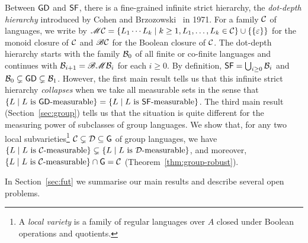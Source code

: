 Between \(\gd\) and \(\sf\), there is a fine-grained infinite strict hierarchy, the \emph{dot-depth hierarchy} introduced by Cohen and Brzozowski~\cite{dot} in 1971.
For a family \(\CC\) of languages, we write by
\(\monc \CC = \{ L_1 \cdots L_k \mid k \geq 1, L_1, \ldots, L_k \in \CC
\} \cup \{\{\varepsilon\}\}\) for the monoid closure of \(\CC\)
and \(\bool\CC\) for the Boolean closure of \(\CC\).
The dot-depth hierarchy starts with the family \(\CB_0\) of all finite
or co-finite languages and continues with \(\CB_{i+1} = \bool \monc \CB_{i}\) for each \(i \geq 0\).
By definition, \(\sf = \bigcup_{i \geq 0} \CB_i\)
and \(\CB_0 \subsetneq \gd \subsetneq \CB_1\).
However, the first main result tells us that this infinite strict hierarchy \emph{collapses} when we take all measurable sets in the sense that 
\(\{ L \mid L \text{ is } \gd\text{-measurable}\}
 = \{ L \mid L \text{ is } \sf\text{-measurable}\}\).
The third main result (Section~\ref{sec:group}) tells us that the situation is quite different for the measuring power of subclasses of group languages.
We show that, for any two local subvarieties\footnote{A \emph{local variety} is a family of regular languages over \(A\) closed under Boolean operations and quotients.} \(\CC \subsetneq \CD \subseteq \group\) of group languages, we have \(\{ L \mid L \text{ is } \CC\text{-measurable}\}
\subsetneq \{ L \mid L \text{ is } \CD\text{-measurable}\}\), and moreover, \(\{ L \mid L \text{ is } \CC\text{-measurable}\} \cap \group = \CC\) (Theorem~\ref{thm:group-robust}).

In Section~\ref{sec:fut} we summarise our main results and describe several open problems.
